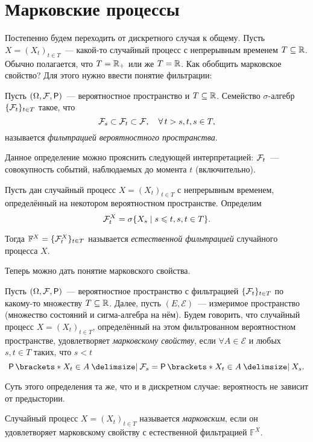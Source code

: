 \section{Марковские процессы}
Постепенно будем переходить от дискретного случая к общему. Пусть \(X = 
(X_{t})_{t \in T}\)~--- какой-то случайный процесс с непрерывным временем \(T 
\subseteq \mathbb{R}\). Обычно полагается, что \(T = \mathbb{R}_{+}\) или же \(T = \mathbb{R}\).  Как 
обобщить марковское свойство? Для этого нужно ввести понятие фильтрации:
\begin{definition}
	Пусть \((\Omega, \F, \Pr)\)~--- вероятностное пространство и \(T \subseteq 
	\mathbb{R}\). Семейство \(\sigma\)-алгебр \(\{\mathcal{F}_{t}\}_{t \in T}\) такое, что
	\[
		\mathcal{F}_{s} \subset \mathcal{F}_{t} \subset \mathcal{F},\quad \forall\,t > s, t, s \in T,
	\]
	называется \emph{фильтрацией вероятностного пространства}.
\end{definition}
Данное определение можно прояснить следующей интерпретацией: \(\mathcal{F}_{t}\)~--- 
совокупность событий, наблюдаемых до момента \(t\) (включительно).

\begin{definition}\label{def-filtration}
	Пусть дан случайный процесс \(X = (X_{t})_{t \in T}\) с непрерывным 
	временем, определённый на некотором вероятностном пространстве. Определим
	\[
		\mathcal{F}_{t}^{X} = \sigma\{X_{s} \mid s \leqslant t, s, t \in T\}.
	\]
	
	Тогда \(\mathbb{F}^{X} = \{\mathcal{F}_{t}^{X}\}_{t \in T}\) называется 
	\emph{естественной фильтрацией} случайного процесса \(X\).
\end{definition}

Теперь можно дать понятие марковского свойства.
\begin{definition}
	Пусть \((\Omega, \F, \Pr)\)~--- вероятностное пространство с фильтрацией 
	\(\{\mathcal{F}_{t}\}_{t \in T}\) по какому-то множеству \(T \subseteq \mathbb{R}\). Далее, 
	пусть \((E, \mathcal{E})\)~--- измеримое пространство (множество состояний 
	и сигма-алгебра на нём). Будем говорить, что случайный процесс \(X = 
	(X_{t})_{t \in T}\), определённый на этом фильтрованном вероятностном 
	пространстве, удовлетворяет \emph{марковскому свойству}, если \(\forall A 
	\in \mathcal{E}\) и любых \(s, t \in T\) таких, что \(s < t\) 
	\[
		\Pr{X_{t} \in A \given \F_{s}} = \Pr{X_{t} \in A \given X_{s}}.
	\]
\end{definition}
Суть этого определения та же, что и в дискретном случае: вероятность не зависит 
от предыстории.
\begin{definition}
	Случайный процесс \(X = (X_{t})_{t \in T}\) называется \emph{марковским}, 
	если он удовлетворяет марковскому свойству с естественной фильтрацией 
	\(\mathbb{F}^{X}\).
\end{definition}

